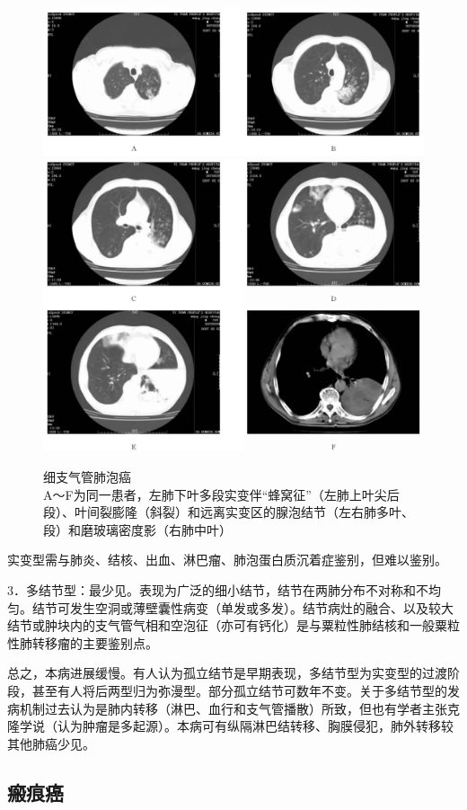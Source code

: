 \begin{figure}[!htbp]
 \centering
 \includegraphics[width=.7\textwidth,height=\textheight,keepaspectratio]{./images/Image00220.jpg}
 \includegraphics[width=.7\textwidth,height=\textheight,keepaspectratio]{./images/Image00221.jpg}
 \captionsetup{justification=centering}
 \caption{细支气管肺泡癌\\{\small A～F为同一患者，左肺下叶多段实变伴“蜂窝征”（左肺上叶尖后段）、叶间裂膨隆（斜裂）和远离实变区的腺泡结节（左右肺多叶、段）和磨玻璃密度影（右肺中叶）}}
 \label{fig9-30}
  \end{figure} 

实变型需与肺炎、结核、出血、淋巴瘤、肺泡蛋白质沉着症鉴别，但难以鉴别。

3．多结节型：最少见。表现为广泛的细小结节，结节在两肺分布不对称和不均匀。结节可发生空洞或薄壁囊性病变（单发或多发）。结节病灶的融合、以及较大结节或肿块内的支气管气相和空泡征（亦可有钙化）是与粟粒性肺结核和一般粟粒性肺转移瘤的主要鉴别点。

总之，本病进展缓慢。有人认为孤立结节是早期表现，多结节型为实变型的过渡阶段，甚至有人将后两型归为弥漫型。部分孤立结节可数年不变。关于多结节型的发病机制过去认为是肺内转移（淋巴、血行和支气管播散）所致，但也有学者主张克隆学说（认为肿瘤是多起源）。本病可有纵隔淋巴结转移、胸膜侵犯，肺外转移较其他肺癌少见。

\subsection{瘢痕癌}

